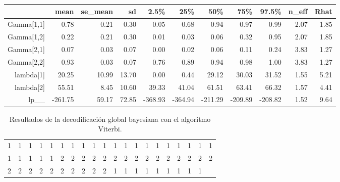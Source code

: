 \documentclass[a4paper]{article}\usepackage[]{graphicx}\usepackage[]{color}
\begin{document}
\begin{table}[ht]
\centering
\begin{tabular}{rrrrrrrrrrr}
  \hline
 & mean & se\_mean & sd & 2.5\% & 25\% & 50\% & 75\% & 97.5\% & n\_eff & Rhat \\ 
  \hline
Gamma[1,1] & 0.78 & 0.21 & 0.30 & 0.05 & 0.68 & 0.94 & 0.97 & 0.99 & 2.07 & 1.85 \\ 
  Gamma[1,2] & 0.22 & 0.21 & 0.30 & 0.01 & 0.03 & 0.06 & 0.32 & 0.95 & 2.07 & 1.85 \\ 
  Gamma[2,1] & 0.07 & 0.03 & 0.07 & 0.00 & 0.02 & 0.06 & 0.11 & 0.24 & 3.83 & 1.27 \\ 
  Gamma[2,2] & 0.93 & 0.03 & 0.07 & 0.76 & 0.89 & 0.94 & 0.98 & 1.00 & 3.83 & 1.27 \\ 
  lambda[1] & 20.25 & 10.99 & 13.70 & 0.00 & 0.44 & 29.12 & 30.03 & 31.52 & 1.55 & 5.21 \\ 
  lambda[2] & 55.51 & 8.45 & 10.60 & 39.33 & 41.04 & 61.51 & 63.41 & 66.32 & 1.57 & 4.41 \\ 
  lp\_\_ & -261.75 & 59.17 & 72.85 & -368.93 & -364.94 & -211.29 & -209.89 & -208.82 & 1.52 & 9.64 \\ 
   \hline
\end{tabular}
\end{table}


\begin{table}[ht]
\centering
\begin{tabular}{rrrrrrrrrrrrrrrrrrrr}
  \hline
  \hline
1 & 1 & 1 & 1 & 1 & 1 & 1 & 1 & 1 & 1 & 1 & 1 & 1 & 1 & 1 & 1 & 1 & 1 & 1 & 1 \\ 
  1 & 1 & 1 & 1 & 1 & 2 & 2 & 2 & 2 & 2 & 2 & 2 & 2 & 2 & 2 & 2 & 2 & 2 & 2 & 2 \\ 
  2 & 2 & 2 & 2 & 2 & 2 & 2 & 2 & 2 & 2 & 1 & 1 & 1 & 1 & 1 & 1 & 1 & 1 & 1 &  \\ 
   \hline
\end{tabular}
\caption{Resultados de la decodificación global bayesiana con el algoritmo Viterbi.} 
\end{table}
\end{document}
